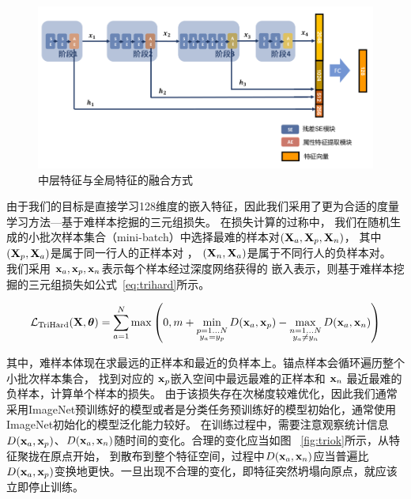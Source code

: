 \begin{figure}
	\centering
	\includegraphics[width=\textwidth]{fig/2018-05-11-16-54-07.png}
	\caption{中层特征与全局特征的融合方式}
	\label{fig:fusion}
\end{figure}

由于我们的目标是直接学习128维度的嵌入特征，因此我们采用了更为合适的度量学习方法---基于难样本挖掘的三元组损失\cite{hermans2017defense}。
在损失计算的过称中，
我们在随机生成的小批次样本集合（mini-batch）中选择最难的样本对$({\mathbf{X}}_a, {\mathbf{X}}_p, {\mathbf{X}}_n)$，
其中 $({\mathbf{X}}_p, {\mathbf{X}}_a)$是属于同一行人的正样本对
， $({\mathbf{X}}_n, {\mathbf{X}}_a)$是属于不同行人的负样本对。
我们采用 ${\mathbf{x}}_a, {\mathbf{x}}_p, {\mathbf{x}}_n$表示每个样本经过深度网络获得的
嵌入表示，则基于难样本挖掘的三元组损失如公式~\ref{eq:trihard}所示。

\begin{equation}
	\mathcal{L}_{\textrm{TriHard}} ({\mathbf{X}}, {\boldsymbol{\theta}}) = \sum_{a=1}^{N} \max\left(
	0, m + \min_{\substack{
			p=1...N \\
			y_a = y_p}
	} D({\mathbf{x}}_a, {\mathbf{x}}_p)
	-  \max_{ \substack{
			n=1...N \\
			y_a \neq y_n }
	} D({\mathbf{x}}_a,{\mathbf{x}}_n)
	\right) \label{eq:trihard}
\end{equation}

其中，难样本体现在求最远的正样本和最近的负样本上。锚点样本会循环遍历整个小批次样本集合，
找到对应的 ${\mathbf{x}}_p$嵌入空间中最远最难的正样本和 ${\mathbf{x}}_n$ 最近最难的负样本，计算单个样本的损失。
由于该损失存在次梯度较难优化，因此我们通常采用ImageNet预训练好的模型或者是分类任务预训练好的模型初始化，通常使用ImageNet初始化的模型泛化能力较好。
在训练过程中，需要注意观察统计信息$D({\mathbf{x}}_a,{\mathbf{x}}_p)$、$D({\mathbf{x}}_a,{\mathbf{x}}_n)$随时间的变化。合理的变化应当如图 ~\ref{fig:triok}所示，从特征聚拢在原点开始，
到散布到整个特征空间，过程中$D({\mathbf{x}}_a,{\mathbf{x}}_n)$应当普遍比$D({\mathbf{x}}_a,{\mathbf{x}}_p)$变换地更快。一旦出现不合理的变化，即特征突然坍塌向原点，就应该立即停止训练。


